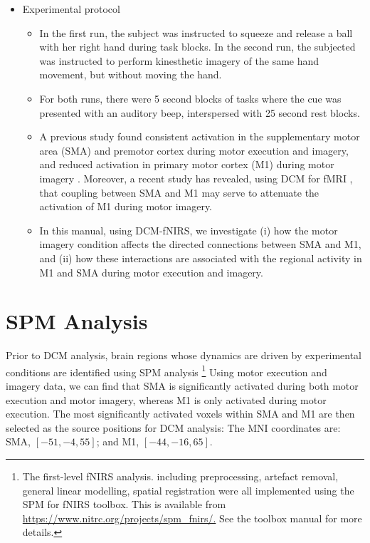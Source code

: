 \begin{itemize} 
\item Experimental protocol 
\begin{itemize}
\item In the first run, the subject was instructed to squeeze and release a ball with her right hand during task blocks. In the second run, the subjected was instructed to perform kinesthetic imagery of the same hand movement, but without moving the hand. 
\item For both runs, there were 5 second blocks of tasks where the cue was presented with
an auditory beep, interspersed with 25 second rest blocks. 
\item A previous study found consistent activation in the supplementary motor area (SMA) and premotor cortex during motor execution and imagery, and reduced activation in primary motor cortex (M1) during motor imagery \citep{hanakawa2003functional}. Moreover, a recent study has revealed, using DCM for fMRI \citep{kasess2008suppressive}, that coupling between SMA and M1 may serve to attenuate the activation of M1 during motor imagery. 
\item In this manual, using DCM-fNIRS, we investigate (i) how the motor imagery condition affects the directed connections between SMA and M1, and (ii) how these interactions are associated with the regional activity in
M1 and SMA during motor execution and imagery.
\end{itemize}
\end{itemize} 

\clearpage
\section{SPM Analysis}
Prior to DCM analysis, brain regions whose dynamics are driven by
experimental conditions are identified using SPM analysis \footnote{The first-level fNIRS analysis. including preprocessing, artefact removal, general linear modelling, spatial registration were all implemented using the SPM for fNIRS toolbox. This is available from \url{https://www.nitrc.org/projects/spm_fnirs/.} See the toolbox manual for more details.} Using motor execution and imagery data, we can find that SMA is significantly activated during both motor execution and motor imagery, whereas M1 is only activated during motor execution. The most significantly activated voxels within SMA and M1 are then selected as the source positions for DCM analysis: The MNI coordinates are: SMA, $[−51, −4, 55]$; and M1, $[−44, −16, 65]$.

